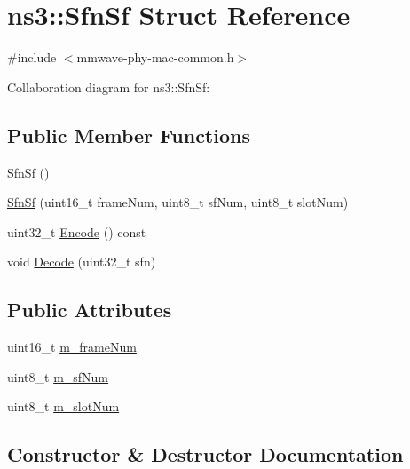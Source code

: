 \hypertarget{structns3_1_1SfnSf}{}\section{ns3\+:\+:Sfn\+Sf Struct Reference}
\label{structns3_1_1SfnSf}


{\ttfamily \#include $<$mmwave-\/phy-\/mac-\/common.\+h$>$}



Collaboration diagram for ns3\+:\+:Sfn\+Sf\+:
\subsection*{Public Member Functions}
\begin{DoxyCompactItemize}
\item 
\hyperlink{structns3_1_1SfnSf_af311ae8e72f274d99af58bfa6c8ab78a}{Sfn\+Sf} ()
\item 
\hyperlink{structns3_1_1SfnSf_ae778df149b140b7b5d09dd293ccf7647}{Sfn\+Sf} (uint16\+\_\+t frame\+Num, uint8\+\_\+t sf\+Num, uint8\+\_\+t slot\+Num)
\item 
uint32\+\_\+t \hyperlink{structns3_1_1SfnSf_a9fff81b2b48af70c77e6b2c51d2fd43b}{Encode} () const 
\item 
void \hyperlink{structns3_1_1SfnSf_a7754e25f628f281a855cc1cfbc17e617}{Decode} (uint32\+\_\+t sfn)
\end{DoxyCompactItemize}
\subsection*{Public Attributes}
\begin{DoxyCompactItemize}
\item 
uint16\+\_\+t \hyperlink{structns3_1_1SfnSf_a28d741175c84feef9a47c8d8bd60b9bf}{m\+\_\+frame\+Num}
\item 
uint8\+\_\+t \hyperlink{structns3_1_1SfnSf_a501403661892f4c9bf1d40ef088f3f36}{m\+\_\+sf\+Num}
\item 
uint8\+\_\+t \hyperlink{structns3_1_1SfnSf_ab4c1dad7c6e986c1c45a8cc723af9745}{m\+\_\+slot\+Num}
\end{DoxyCompactItemize}


\subsection{Constructor \& Destructor Documentation}
